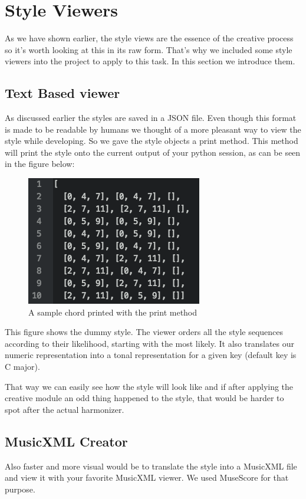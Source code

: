 \section{Style Viewers} 
\label{sec:viewers}
As we have shown earlier, the style views are the essence of the creative process so it's worth looking at this in its raw form. That's why we included some style viewers into the project to apply to this task. In this section we introduce them.

\subsection{Text Based viewer}
\label{sec:viewers.text}
As discussed earlier the styles are saved in a JSON file. Even though this format is made to be readable by humans we thought of a more pleasant way to view the style while developing. So we gave the style objects a print method. This method will print the style onto the current output of your python session, as can be seen in the figure below:
\begin{figure}[ht]
\centering
\includegraphics[scale=1]{Chapters/pic/text_print.png}
\caption{A sample chord printed with the print method}
\end{figure}

This figure shows the dummy style. The viewer orders all the style sequences according to their likelihood, starting with the most likely. It also translates our numeric representation into a tonal representation for a given key (default key is C major).

That way we can easily see how the style will look like and if after applying the creative module an odd thing happened to the style, that would be harder to spot after the actual harmonizer. 

\subsection{MusicXML Creator}
\label{sec:viewers.musicxml}
Also faster and more visual would be to translate the style into a MusicXML file and view it with your favorite MusicXML viewer. We used MuseScore for that purpose. 

